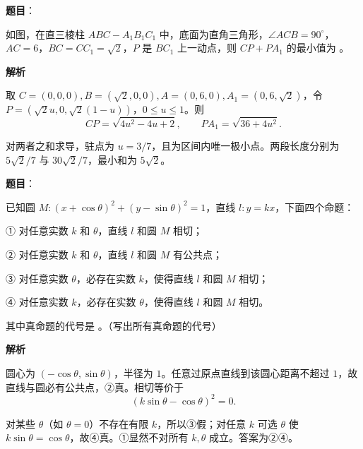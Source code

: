 \begin{answer}

\textbf{题目}：

如图，在直三棱柱 $ABC-A_1B_1C_1$ 中，底面为直角三角形，$\angle ACB=90^\circ$，$AC=6\text{，}BC=CC_1=\sqrt2$，$P$ 是 $BC_1$ 上一动点，则 $CP+PA_1$ 的最小值为 \gkblank{}。
\nopagebreak[4]
\begin{center}\end{center}
\nopagebreak[4]
\textbf{解析}

取 $C=(0,0,0),B=(\sqrt2,0,0),A=(0,6,0),A_1=(0,6,\sqrt2)$，令 $P=(\sqrt2u,0,\sqrt2(1-u))$，$0\le u\le1$。则
\nopagebreak[4]
\[
CP=\sqrt{4u^2-4u+2},\qquad PA_1=\sqrt{36+4u^2}.
\]

对两者之和求导，驻点为 $u=3/7$，且为区间内唯一极小点。两段长度分别为 $5\sqrt2/7$ 与 $30\sqrt2/7$，最小和为 $5\sqrt2$。


\end{answer}
\begin{answer}

\textbf{题目}：

已知圆 $M:(x+\cos\theta)^2+(y-\sin\theta)^2=1$，直线 $l:y=kx$，下面四个命题：

① 对任意实数 $k$ 和 $\theta$，直线 $l$ 和圆 $M$ 相切；

② 对任意实数 $k$ 和 $\theta$，直线 $l$ 和圆 $M$ 有公共点；

③ 对任意实数 $\theta$，必存在实数 $k$，使得直线 $l$ 和圆 $M$ 相切；

④ 对任意实数 $k$，必存在实数 $\theta$，使得直线 $l$ 和圆 $M$ 相切。

其中真命题的代号是 \gkblank{}。（写出所有真命题的代号）

\textbf{解析}

圆心为 $(-\cos\theta,\sin\theta)$，半径为 $1$。任意过原点直线到该圆心距离不超过 $1$，故直线与圆必有公共点，②真。相切等价于
\nopagebreak[4]
\[
(k\sin\theta-\cos\theta)^2=0.
\]

对某些 $\theta$（如 $\theta=0$）不存在有限 $k$，所以③假；对任意 $k$ 可选 $\theta$ 使 $k\sin\theta=\cos\theta$，故④真。①显然不对所有 $k,\theta$ 成立。答案为②④。


\end{answer}
